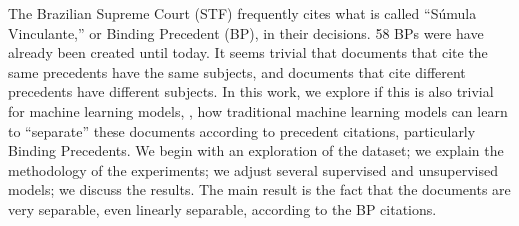 The Brazilian Supreme Court (STF) frequently cites what is called ``Súmula Vinculante,'' or Binding Precedent (BP), in their decisions. 58 BPs were have already been created until today. It seems trivial that documents that cite the same precedents have the same subjects, and documents that cite different precedents have different subjects. In this work, we explore if this is also trivial for machine learning models, \ie, how traditional machine learning models can learn to ``separate'' these documents according to precedent citations, particularly Binding Precedents. We begin with an exploration of the dataset; we explain the methodology of the experiments; we adjust several supervised and unsupervised models; we discuss the results. The main result is the fact that the documents are very separable, even linearly separable, according to the BP citations.
